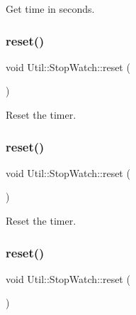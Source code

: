 Get time in seconds. 

\mbox{\label{classUtil_1_1StopWatch_a59e537525567ed9e0701635fb60148b7}} 
\subsubsection{\texorpdfstring{reset()}{reset()}\hspace{0.1cm}{\footnotesize\ttfamily [1/3]}}
{\footnotesize\ttfamily void Util\+::\+Stop\+Watch\+::reset (\begin{DoxyParamCaption}{ }\end{DoxyParamCaption})}



Reset the timer. 

\mbox{\label{classUtil_1_1StopWatch_a59e537525567ed9e0701635fb60148b7}} 
\subsubsection{\texorpdfstring{reset()}{reset()}\hspace{0.1cm}{\footnotesize\ttfamily [2/3]}}
{\footnotesize\ttfamily void Util\+::\+Stop\+Watch\+::reset (\begin{DoxyParamCaption}{ }\end{DoxyParamCaption})}



Reset the timer. 

\mbox{\label{classUtil_1_1StopWatch_a59e537525567ed9e0701635fb60148b7}} 
\subsubsection{\texorpdfstring{reset()}{reset()}\hspace{0.1cm}{\footnotesize\ttfamily [3/3]}}
{\footnotesize\ttfamily void Util\+::\+Stop\+Watch\+::reset (\begin{DoxyParamCaption}{ }\end{DoxyParamCaption})}



